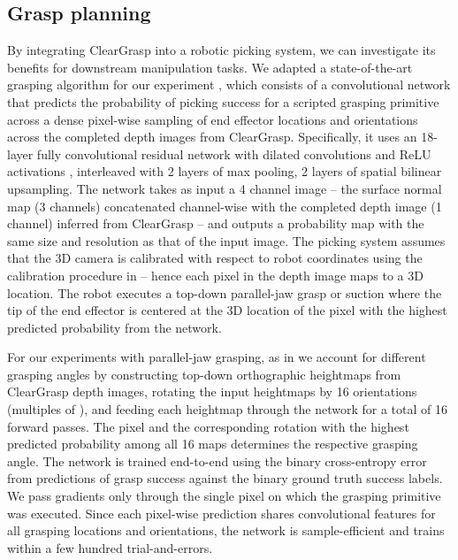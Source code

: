 \documentclass[letterpaper, 10 pt, conference]{ieeeconf}
\begin{document}
\subsection{Grasp planning}
\label{sec:grasping}
By integrating ClearGrasp into a robotic picking system, we can investigate its benefits for downstream manipulation tasks. We adapted a state-of-the-art grasping algorithm for our experiment \cite{zeng2018robotic,zeng2018learning,zeng2019tossingbot}, which consists of a convolutional network that predicts the probability of picking success for a scripted grasping primitive across a dense pixel-wise sampling of end effector locations and orientations across the completed depth images from ClearGrasp. Specifically, it uses an 18-layer fully convolutional residual network \cite{he2016deep} with dilated convolutions \cite{Yu2017} and ReLU activations \cite{nair2010rectified}, interleaved with 2 layers of max pooling, 2 layers of spatial bilinear  upsampling. 
The network takes as input a 4 channel image -- the surface normal map (3 channels) concatenated channel-wise with the completed depth image (1 channel) inferred from ClearGrasp -- and outputs a probability map with the same size and resolution as that of the input image. The picking system assumes that the 3D camera is calibrated with respect to robot coordinates using the calibration procedure in \cite{zeng2018learning} -- hence each pixel in the depth image maps to a 3D location. The robot executes a top-down parallel-jaw grasp or suction where the tip of the end effector is centered at the 3D location of the pixel with the highest predicted probability from the network.

For our experiments with parallel-jaw grasping, as in \cite{zeng2018robotic} we account for different grasping angles by constructing top-down orthographic heightmaps from ClearGrasp depth images, rotating the input heightmaps by 16 orientations (multiples of ), and feeding each heightmap through the network for a total of 16 forward passes. The pixel and the corresponding rotation with the highest predicted probability among all 16 maps determines the respective grasping angle. The network is trained end-to-end using the binary cross-entropy error from predictions of grasp success against the binary ground truth success labels. We pass gradients only through the single pixel on which the grasping primitive was executed. Since each pixel-wise prediction shares convolutional features for all grasping locations and orientations, the network is sample-efficient and trains within a few hundred trial-and-errors.
\end{document}
